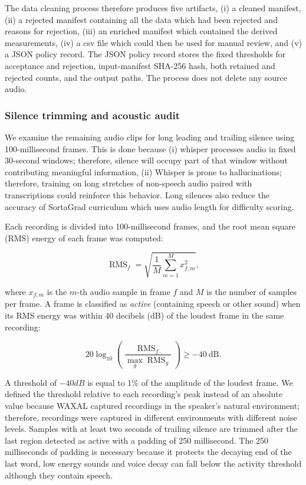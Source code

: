 {The data cleaning process therefore produces five artifacts, (i) a cleaned manifest, (ii) a rejected manifest containing all the data which had been rejected and reasons for rejection, (iii) an enriched manifest which contained the derived measurements, (iv) a csv file which could then be used for manual review, and (v) a JSON policy record. The JSON policy record stores the fixed thresholds for acceptance and rejection, input-manifest SHA-256 hash, both retained and rejected counts, and the output paths. The process does not delete any source audio.

\subsubsection{Silence trimming and acoustic audit}

We examine the remaining audio clips for long leading and trailing silence using 100-millisecond frames. This is done because (i) whisper processes audio in fixed 30-second windows; therefore, silence will occupy part of that window without contributing meaningful information, (ii) Whisper is prone to hallucinations; therefore, training on long stretches of non-speech audio paired with transcriptions could reinforce this behavior\citep{Koenecke2024}. Long silences also reduce the accuracy of SortaGrad curriculum which uses audio length for difficulty scoring.

Each recording is divided into 100-millisecond frames, and the
root mean square (RMS) energy of each frame was computed:

\begin{equation}
    \operatorname{RMS}_f = \sqrt{\frac{1}{M}\sum_{m=1}^{M} x_{f,m}^2},
    \label{eq:rms}
\end{equation}

where $x_{f,m}$ is the $m$-th audio sample in frame $f$ and $M$ is the number of
samples per frame. A frame is classified as \emph{active} (containing speech or
other sound) when its RMS energy was within 40 decibels (dB) of the loudest frame
in the same recording:

\begin{equation}
    20\log_{10}\!\left(\frac{\operatorname{RMS}_f}{\max_{g}\operatorname{RMS}_g}\right) \geq -40~\text{dB}.
    \label{eq:active}
\end{equation}

 A threshold of $-40dB$ is equal to 1\% of the amplitude of the loudest frame. We defined the threshold relative to each recording's peak instead of an absolute value because WAXAL captured recordings in the speaker's natural environment; therefore, recordings were captured in different environments with different noise levels. 
 Samples with at least two seconds of trailing silence are trimmed after the last region detected as active with a padding of 250 millisecond. The 250 milliseconds of padding is necessary because it protects the decaying end of the last word, low energy sounds and voice decay can fall below the activity threshold although they contain speech. 
 
}
